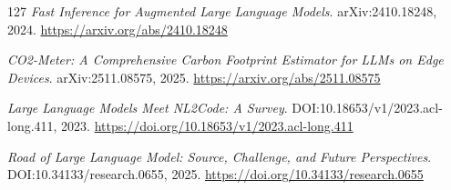 \documentclass[11pt,a4paper]{article}
\begin{document}
\begin{thebibliography}{127}
\newblock \emph{Fast Inference for Augmented Large Language Models}.
\newblock arXiv:2410.18248, 2024.
\newblock \url{https://arxiv.org/abs/2410.18248}

\newblock \emph{CO2-Meter: A Comprehensive Carbon Footprint Estimator for LLMs on Edge Devices}.
\newblock arXiv:2511.08575, 2025.
\newblock \url{https://arxiv.org/abs/2511.08575}

\newblock \emph{Large Language Models Meet NL2Code: A Survey}.
\newblock DOI:10.18653/v1/2023.acl-long.411, 2023.
\newblock \url{https://doi.org/10.18653/v1/2023.acl-long.411}

\newblock \emph{Road of Large Language Model: Source, Challenge, and Future Perspectives}.
\newblock DOI:10.34133/research.0655, 2025.
\newblock \url{https://doi.org/10.34133/research.0655}

\end{thebibliography}
\end{document}
